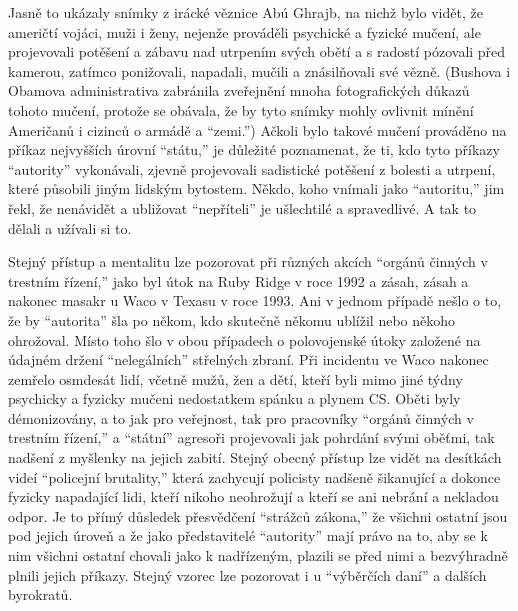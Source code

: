 \documentclass{book}
\begin{document}
Jasně to ukázaly snímky z irácké věznice Abú Ghrajb, na nichž bylo vidět, že američtí vojáci, muži i ženy, nejenže prováděli psychické a fyzické mučení, ale projevovali potěšení a zábavu nad utrpením svých obětí a s radostí pózovali před kamerou, zatímco ponižovali, napadali, mučili a znásilňovali své vězně. (Bushova i Obamova administrativa zabránila zveřejnění mnoha fotografických důkazů tohoto mučení, protože se obávala, že by tyto snímky mohly ovlivnit mínění Američanů i cizinců o armádě a \enquote{zemi.}) Ačkoli bylo takové mučení prováděno na příkaz nejvyšších úrovní \enquote{státu,} je důležité poznamenat, že ti, kdo tyto příkazy \enquote{autority} vykonávali, zjevně projevovali sadistické potěšení z bolesti a utrpení, které působili jiným lidským bytostem. Někdo, koho vnímali jako \enquote{autoritu,} jim řekl, že nenávidět a ubližovat \enquote{nepříteli} je ušlechtilé a spravedlivé. A tak to dělali a užívali si to.

Stejný přístup a mentalitu lze pozorovat při různých akcích \enquote{orgánů činných v trestním řízení,} jako byl útok na Ruby Ridge v roce 1992 a zásah, zásah a nakonec masakr u Waco v Texasu v roce 1993. Ani v jednom případě nešlo o to, že by \enquote{autorita} šla po někom, kdo skutečně někomu ublížil nebo někoho ohrožoval. Místo toho šlo v obou případech o polovojenské útoky založené na údajném držení \enquote{nelegálních} střelných zbraní. Při incidentu ve Waco nakonec zemřelo osmdesát lidí, včetně mužů, žen a dětí, kteří byli mimo jiné týdny psychicky a fyzicky mučeni nedostatkem spánku a plynem CS. Oběti byly démonizovány, a to jak pro veřejnost, tak pro pracovníky \enquote{orgánů činných v trestním řízení,} a \enquote{státní} agresoři projevovali jak pohrdání svými oběťmi, tak nadšení z myšlenky na jejich zabití. Stejný obecný přístup lze vidět na desítkách videí \enquote{policejní brutality,} která zachycují policisty nadšeně šikanující a dokonce fyzicky napadající lidi, kteří nikoho neohrožují a kteří se ani nebrání a nekladou odpor. Je to přímý důsledek přesvědčení \enquote{strážců zákona,} že všichni ostatní jsou pod jejich úroveň a že jako představitelé \enquote{autority} mají právo na to, aby se k nim všichni ostatní chovali jako k nadřízeným, plazili se před nimi a bezvýhradně plnili jejich příkazy. Stejný vzorec lze pozorovat i u \enquote{výběrčích daní} a dalších byrokratů.
\end{document}
